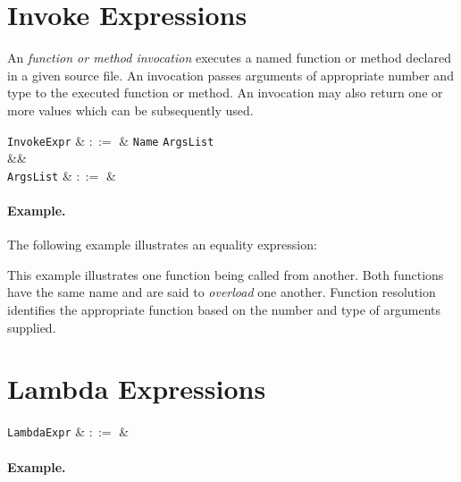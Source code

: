 \section{Invoke Expressions}
\label{c_expr_invoke}
An {\em function or method invocation} executes a named function or method declared in a given source file.  An invocation passes arguments of appropriate number and type to the executed function or method.  An invocation may also return one or more values which can be subsequently used.


\begin{syntax}
  \verb+InvokeExpr+ & $::=$ & \verb+Name+ \token{(} \verb+ArgsList+ \token{)}\\
&&\\
\verb+ArgsList+ & $::=$ & \\
\end{syntax}

\paragraph{Example.}

The following example illustrates an equality expression:



This example illustrates one function being called from another.  Both functions have the same name and are said to {\em overload} one another.  Function resolution identifies the appropriate function based on the number and type of arguments supplied.  


\section{Lambda Expressions}
\label{c_expr_lambda}

\begin{syntax}
  \verb+LambdaExpr+ & $::=$ &\\
\end{syntax}

\paragraph{Example.}

